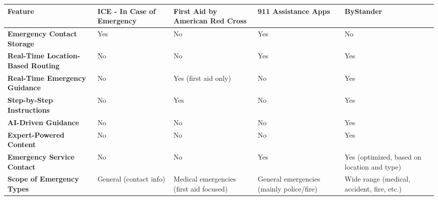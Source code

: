 \begin{table}[htp]
\tiny
\centering
\begin{tabular}{|p{2cm}|p{2cm}|p{2cm}|p{2cm}|p{2cm}|}
\hline
\textbf{Feature}                           & \textbf{ICE - In Case of Emergency}                     & \textbf{First Aid by American Red Cross}            & \textbf{911 Assistance Apps}                        & \textbf{ByStander}                                     \\ \hline
\textbf{Emergency Contact Storage}          & Yes                                               & No                                            & Yes                                            & No                                               \\ \hline
\textbf{Real-Time Location-Based Routing}   & No                                                & No                                            & Yes                                            & Yes                                              \\ \hline
\textbf{Real-Time Emergency Guidance}       & No                                                & Yes (first aid only)                          & No                                             & Yes                                              \\ \hline
\textbf{Step-by-Step Instructions}          & No                                                & Yes                                           & No                                             & Yes                                              \\ \hline
\textbf{AI-Driven Guidance}                 & No                                                & No                                            & No                                             & Yes                                              \\ \hline
\textbf{Expert-Powered Content}             & No                                                & No                                            & No                                             & Yes                                              \\ \hline
\textbf{Emergency Service Contact}          & No                                                & No                                            & Yes                                            & Yes (optimized, based on location and type)      \\ \hline
\textbf{Scope of Emergency Types}           & General (contact info)                            & Medical emergencies (first aid focused)       & General emergencies (mainly police/fire)       & Wide range (medical, accident, fire, etc.)       \\ \hline

\end{tabular}
\end{table}
